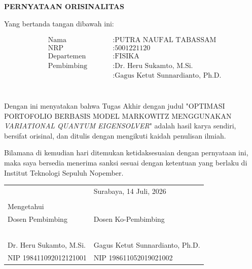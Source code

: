 \begin{center}
	\large
	\textbf{PERNYATAAN ORISINALITAS}
\end{center}


\vspace{2ex}


\noindent Yang bertanda tangan dibawah ini:

\begin{minipage}{5cm}
	\begin{align*}
		&\text{Nama} \qquad &&: \text{PUTRA NAUFAL TABASSAM} \\
		&\text{NRP} \qquad &&: \text{5001221120} \\
		&\text{Departemen} \qquad &&: \text{FISIKA} \\
		&\text{Pembimbing} \qquad &&: \text{Dr. Heru Sukamto, M.Si.} \\
		& \qquad &&: \text{Gagus Ketut Sunnardianto, Ph.D.} \\
	\end{align*}
\end{minipage} \\

Dengan ini menyatakan bahwa Tugas Akhir dengan judul "OPTIMASI PORTOFOLIO BERBASIS MODEL MARKOWITZ MENGGUNAKAN \textit{VARIATIONAL QUANTUM EIGENSOLVER}" adalah hasil karya sendiri, bersifat orisinal, dan ditulis dengan mengikuti kaidah penulisan ilmiah.

Bilamana di kemudian hari ditemukan ketidaksesuaian dengan pernyataan ini, maka saya bersedia menerima sanksi sesuai dengan ketentuan yang berlaku di Institut Teknologi Sepuluh Nopember.

\vspace{8ex}

\noindent\begin{tabularx}{\textwidth}{X l}
	& Surabaya, 14 Juli, 2026 \\
	& \\
	Mengetahui & \\
	Dosen Pembimbing & Dosen Ko-Pembimbing\\
	& \\
	& \\
	& \\
	& \\
	& \\
	Dr. Heru Sukamto, M.Si. & Gagus Ketut Sunnardianto, Ph.D. \\
	NIP 198411092012121001 & NIP 198611052019021002\\
\end{tabularx}

